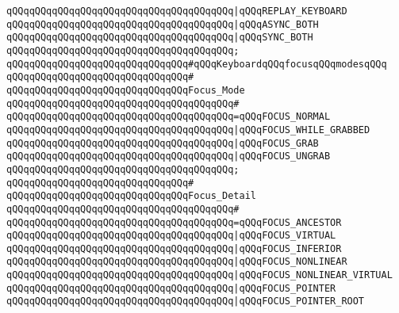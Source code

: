 \verb|qQQqqQQqqQQqqQQqqQQqqQQqqQQqqQQqqQQqqQQq|\verb#|qQQqREPLAY_KEYBOARD#\newline
\verb|qQQqqQQqqQQqqQQqqQQqqQQqqQQqqQQqqQQqqQQq|\verb#|qQQqASYNC_BOTH#\newline
\verb|qQQqqQQqqQQqqQQqqQQqqQQqqQQqqQQqqQQqqQQq|\verb#|qQQqSYNC_BOTH#\newline
\verb|qQQqqQQqqQQqqQQqqQQqqQQqqQQqqQQqqQQqqQQq;|\newline
\newline
\verb|qQQqqQQqqQQqqQQqqQQqqQQqqQQqqQQq#qQQqKeyboardqQQqfocusqQQqmodesqQQq|\newline
\verb|qQQqqQQqqQQqqQQqqQQqqQQqqQQqqQQq#|\newline
\verb|qQQqqQQqqQQqqQQqqQQqqQQqqQQqqQQqFocus_Mode|\newline
\verb|qQQqqQQqqQQqqQQqqQQqqQQqqQQqqQQqqQQqqQQq#|\newline
\verb|qQQqqQQqqQQqqQQqqQQqqQQqqQQqqQQqqQQqqQQq=qQQqFOCUS_NORMAL|\newline
\verb|qQQqqQQqqQQqqQQqqQQqqQQqqQQqqQQqqQQqqQQq|\verb#|qQQqFOCUS_WHILE_GRABBED#\newline
\verb|qQQqqQQqqQQqqQQqqQQqqQQqqQQqqQQqqQQqqQQq|\verb#|qQQqFOCUS_GRAB#\newline
\verb|qQQqqQQqqQQqqQQqqQQqqQQqqQQqqQQqqQQqqQQq|\verb#|qQQqFOCUS_UNGRAB#\newline
\verb|qQQqqQQqqQQqqQQqqQQqqQQqqQQqqQQqqQQqqQQq;|\newline
\verb|qQQqqQQqqQQqqQQqqQQqqQQqqQQqqQQq#|\newline
\verb|qQQqqQQqqQQqqQQqqQQqqQQqqQQqqQQqFocus_Detail|\newline
\verb|qQQqqQQqqQQqqQQqqQQqqQQqqQQqqQQqqQQqqQQq#|\newline
\verb|qQQqqQQqqQQqqQQqqQQqqQQqqQQqqQQqqQQqqQQq=qQQqFOCUS_ANCESTOR|\newline
\verb|qQQqqQQqqQQqqQQqqQQqqQQqqQQqqQQqqQQqqQQq|\verb#|qQQqFOCUS_VIRTUAL#\newline
\verb|qQQqqQQqqQQqqQQqqQQqqQQqqQQqqQQqqQQqqQQq|\verb#|qQQqFOCUS_INFERIOR#\newline
\verb|qQQqqQQqqQQqqQQqqQQqqQQqqQQqqQQqqQQqqQQq|\verb#|qQQqFOCUS_NONLINEAR#\newline
\verb|qQQqqQQqqQQqqQQqqQQqqQQqqQQqqQQqqQQqqQQq|\verb#|qQQqFOCUS_NONLINEAR_VIRTUAL#\newline
\verb|qQQqqQQqqQQqqQQqqQQqqQQqqQQqqQQqqQQqqQQq|\verb#|qQQqFOCUS_POINTER#\newline
\verb|qQQqqQQqqQQqqQQqqQQqqQQqqQQqqQQqqQQqqQQq|\verb#|qQQqFOCUS_POINTER_ROOT#\newline
